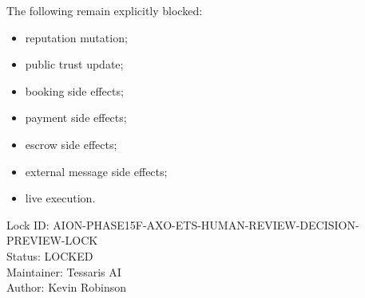 The following remain explicitly blocked:

\begin{itemize}
  \item reputation mutation;
  \item public trust update;
  \item booking side effects;
  \item payment side effects;
  \item escrow side effects;
  \item external message side effects;
  \item live execution.
\end{itemize}

Lock ID: AION-PHASE15F-AXO-ETS-HUMAN-REVIEW-DECISION-PREVIEW-LOCK \\
Status: LOCKED \\
Maintainer: Tessaris AI \\
Author: Kevin Robinson
